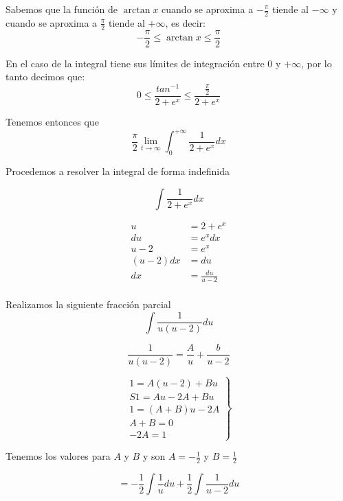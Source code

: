 \documentclass[12pt]{article}
\begin{document}
\begin{flushleft}
Sabemos que la función de $\arctan{x}$ cuando se aproxima a $-\frac{\pi}{2}$ tiende al $-\infty$ y cuando se aproxima a $\frac{\pi}{2}$ tiende al $+\infty$, es decir:\\



$$-\frac{\pi}{2}\leq \arctan{x}\leq \frac{\pi}{2}$$

En el caso de la integral tiene sus límites de integración entre $0$ y $+\infty$, por lo tanto decimos que:\\

$$0\leq \frac{tan^{-1}}{2+e^{x}}\leq \frac{\frac{\pi}{2}}{2+e^{x}}$$

Tenemos entonces que\\


$$\frac{\pi}{2}\lim_{t \to \infty }\int_{0}^{+\infty}\frac{1}{2+e^{x}}dx$$

Procedemos a resolver la integral de forma indefinida 


$$\int \frac{1}{2+e^{x}}dx$$

\begin{align*}
    u& = 2+e^{x}\\
    du& = e^xdx\\
    u-2& = e^x\\
    (u-2)dx& = du\\
    dx&=\frac{du}{u-2}\\
\end{align*}

Realizamos la siguiente fracción parcial\\

$$\int \frac{1}{u(u-2)}du$$

$$\frac{1}{u(u-2)}=\frac{A}{u}+\frac{b}{u-2}$$

$$\left.\begin{matrix}
    1 = A(u-2)+Bu\\S
    1=Au-2A+Bu\\
1 = (A+B)u - 2A\\
A+B=0\\
-2A=1
\end{matrix}\right\}$$



Tenemos los valores para $A$ y $B$ y son $A=-\frac{1}{2}$ y $B=\frac{1}{2}$




\begin{flushleft}
    $$=-\frac{1}{2} \int \frac{1}{u}du + \frac{1}{2}\int \frac{1}{u-2}du$$
\end{flushleft}




\end{flushleft}
\end{document}
